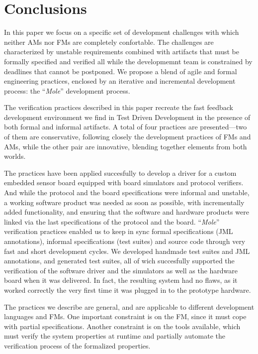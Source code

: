 \documentclass[english]{lni}
\newcommand{\mole}{``\emph{Mole}''\xspace}
\begin{document}
\section{Conclusions}
\label{sec:conclusions}

In this paper we focus on a specific set of development challenges with which neither AMs nor FMs are completely confortable.
The challenges are characterized by unstable requirements combined with artifacts that must be formally specified and verified all while the developmemnt team is constrained by deadlines that cannot be postponed.
We propose a blend of agile and formal engineering practices, enclosed by an iterative and incremental development process: the \mole development process.

The verification practices described in this paper recreate the fast feedback development environment we find in Test Driven Development in the presence of both formal and informal artifacts.
A total of four practices are presented---two of them are conservative, following closely the development practices of FMs and AMs, while the other pair are innovative, blending together elements from both worlds.

The practices have been applied succesfully to develop a driver for a custom embedded sensor board equipped with board simulators and protocol verifiers. 
And while the protocol and the board specifications were informal and unstable, a working software product was needed as soon as possible, with incrementally added functionality, and ensuring that the software and hardware products were linked via the last specifications of the protocol and the board.
\mole verification practices enabled us to keep in sync formal specifications (JML annotations), informal specifications (test suites) and source code through very fast and short development cycles.
We developed handmade test suites and JML annotations, and generated test suites, all of wich succesfully supported the verification of the software driver and the simulators as well as the hardware board when it was delivered.
In fact, the resulting system had no flaws, as it worked correctly the very first time it was plugged in to the prototype hardware.

The practices we describe are general, and are applicable to different development languages and FMs.
One important constraint is on the FM, since it must cope with partial specifications.
Another constraint is on the tools available, which must verify the system properties at runtime and partially automate the verification process of the formalized properties.

%


\end{document}
